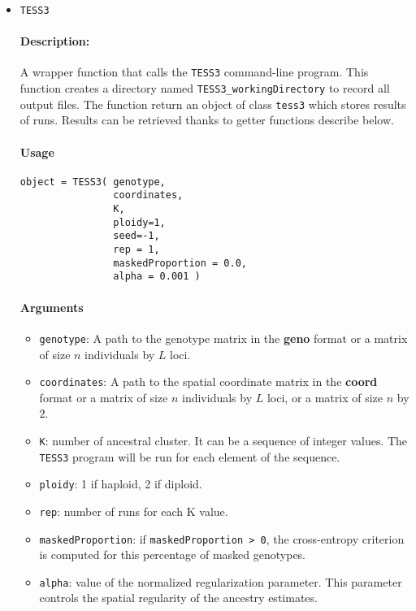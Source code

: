 \documentclass[10pt,a4paper]{article}
\begin{document}
\begin{itemize}

\item \verb|TESS3|

\paragraph{Description:}
A wrapper function that calls the {\tt TESS3} command-line program. This function creates a directory named \verb|TESS3_workingDirectory| to record all output files. The function return an object of class \verb|tess3| which stores results of runs. Results can be retrieved thanks to getter functions describe below.
\paragraph{Usage}
\begin{Verbatim}
object = TESS3( genotype,
                coordinates,
                K,
                ploidy=1,
                seed=-1, 
                rep = 1, 
                maskedProportion = 0.0, 
                alpha = 0.001 )
\end{Verbatim}
\paragraph{Arguments}
\begin{itemize}
\item \verb|genotype|:  A path to the genotype matrix in the {\bf geno} format or a matrix of size $n$ individuals by $L$ loci. 
\item \verb|coordinates|:  A path to the spatial coordinate matrix in the {\bf coord} format or a matrix of size $n$ individuals by $L$ loci, or a matrix of size $n$ by $2$. 
\item \verb|K|: number of ancestral cluster. It can be a sequence of integer values. The {\tt TESS3} program will be run for each element of the sequence.
\item \verb|ploidy|: 1 if haploid, 2 if diploid.
\item \verb|rep|: number of runs for each K value.
\item \verb|maskedProportion|: if \verb|maskedProportion > 0|, the cross-entropy criterion is computed for this percentage of masked genotypes.
\item \verb|alpha|: value of the normalized regularization parameter. This parameter controls the spatial regularity of the ancestry estimates.
\end{itemize}


\end{itemize}
\end{document}
